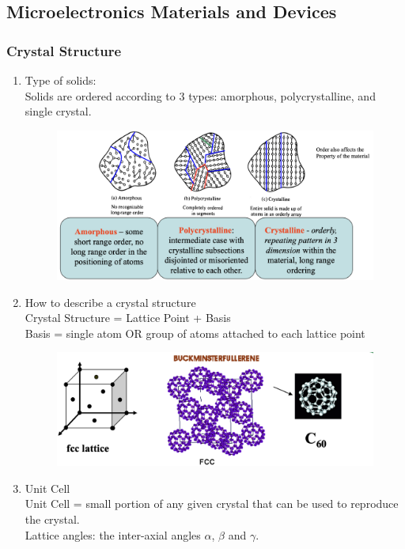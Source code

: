 \documentclass{article}
\begin{document}
\newpage
\subsection{Microelectronics Materials and Devices}
\subsubsection{Crystal Structure}
\begin{enumerate}
    \item Type of solids: \\
    Solids are ordered according to 3 types: amorphous, polycrystalline, and single crystal.
    \begin{figure}[h]
        \centering
        \includegraphics[width=0.75\linewidth]{image/crstal.png}
    \end{figure}
    \item How to describe a crystal structure\\
    Crystal Structure = Lattice Point + Basis \\
    Basis = single atom OR group of atoms attached to each lattice point \\
    \begin{figure}[h]
        \centering
        \includegraphics[width=0.8\linewidth]{image/latticestructure.png}
    \end{figure}
    \item Unit Cell \\
    Unit Cell = small portion of any given crystal that can be used to reproduce the crystal. \\
    Lattice angles: the inter-axial angles $\alpha$, $\beta$ and $\gamma$. \\

\end{enumerate}
\end{document}
